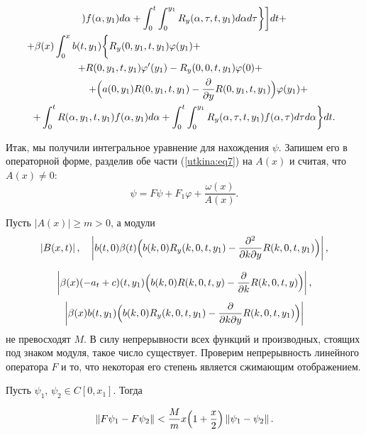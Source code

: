 \begin{multline}
)f(\alpha ,y_1 )d\alpha + \int _0^t \int _0^{y_1 } R_y (\alpha
,\tau ,t,y_1 )d\alpha d\tau \biggr\}\biggr]dt +
\\
 + \beta (x)\int _0^x b(t,y_1 )
 \biggl\{
 R_y (0,y_1 ,t,y_1 )\varphi (y_1 ) + \hspace{5cm}  \\
 +
R(0,y_1 ,t,y_1 ){\varphi }'(y_1 ) - R_y (0, 0,t,y_1 )\varphi (0) + \hspace{1cm} 
\\
\hspace{1cm}
 + \Bigl(a(0,y_1 )R(0,y_1 ,t,y_1 ) - \frac{\partial }{\partial y}R(0,y_1 ,t,y_1
)\Bigr)\varphi (y_1 ) + \\
 + \int _0^t R(\alpha ,y_1 ,t,y_1 )f(\alpha ,y_1 )d\alpha +
\int _0^t \int _0^{y_1 } R_y (\alpha ,\tau ,t,y_1 )f(\alpha
,\tau )d\tau d\alpha \biggr\}dt. 
 \end{multline}
 
Итак, мы получили интегральное уравнение для нахождения $\psi $. Запишем его
в операторной форме, разделив обе части (\ref{utkina:eq7}) на $A(x)$ и считая, что \mbox{$A(x) \ne
0$:}
\begin{equation}
\label{utkina:eq8}
\psi = F\psi + F_1 \varphi + \frac{\omega (x)}{A(x)}.
\end{equation}

Пусть $\left| {A(x)} \right| \ge m > 0$, а модули 
$$\left| {B(x,t)} \right|,\quad 
\left| b(t, 0)\beta (t)\Bigl(b(k, 0)R_y (k, 0,t,y_1 ) - \frac{\partial ^2}{\partial
k\partial y}R(k, 0,t,y_1 )\Bigr) \right|,
$$

\[
\left| \beta (x)( - a_t + c)(t,y_1 )\Bigl(b(k, 0)R(k, 0,t,y) - \frac{\partial
}{\partial k}R(k, 0,t,y)\Bigr) \right|,
\]
\[
\left| \beta (x)b(t,y_1 )\Bigl(b(k, 0)R_y (k, 0,t,y_1 ) - \frac{\partial
}{\partial k\partial y}R(k, 0,t,y_1 )\Bigr)
\right|
\]
не превосходят $M$.  В силу непрерывности всех функций и производных, стоящих под знаком модуля, такое число существует. Проверим непрерывность линейного оператора
$F$ и то, что некоторая его степень является сжимающим отображением.



Пусть $\psi _1 $, $\psi _2 \in C\left[ {0,x_1 } \right]$. Тогда

\begin{equation}
\label{utkina:eq9}
\left\| {F\psi _1 - F\psi _2 } \right\| < \frac{M}{m}x\Bigl(1 +
\frac{x}{2}\Bigr)\left\| {\psi _1 - \psi _2 } \right\|.
\end{equation}



